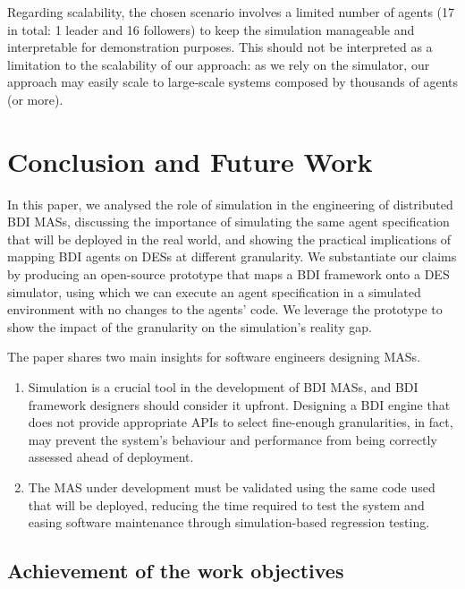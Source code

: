 Regarding scalability, the chosen scenario involves a limited number of agents
 (17 in total: 1 leader and 16 followers)
 to keep the simulation manageable and interpretable for demonstration purposes.
This should not be interpreted as a limitation to the scalability of our approach:
as we rely on the \alchemist{} simulator,
our approach may easily scale to large-scale systems composed by thousands of agents (or more).

\section{Conclusion and Future Work}\label{sec:simulation:conclusion}

In this paper,
we analysed the role of simulation in the engineering of distributed \ac{BDI} \acp{MAS},
discussing the importance of simulating the same agent specification that will be deployed in the real world,
and showing the practical implications of mapping \ac{BDI} agents on \acp{DES} at different granularity.
%
We substantiate our claims by producing an open-source prototype that maps a \ac{BDI} framework onto a \ac{DES} simulator,
using which we can execute an agent specification in a simulated environment with no changes to the agents' code.
%
We leverage the prototype to show the impact of the granularity on the simulation's reality gap.


The paper shares two main insights for software engineers designing \acp{MAS}.
%
\begin{enumerate}[wide,labelwidth=!,labelindent=0pt]
    \item Simulation is a crucial tool in the development of \ac{BDI} \acp{MAS}, and \ac{BDI} framework designers should consider it upfront.
    Designing a \ac{BDI} engine that does not provide appropriate \acp{API} to select fine-enough granularities,
    in fact,
    may prevent the system's behaviour and performance from being correctly assessed ahead of deployment.
    \item The \ac{MAS} under development must be validated using the same code used that will be deployed,
    reducing the time required to test the system
    and easing software maintenance through simulation-based regression testing.
\end{enumerate}

\subsection{Achievement of the work objectives}\label{subsec:answering-the-research-questions}

